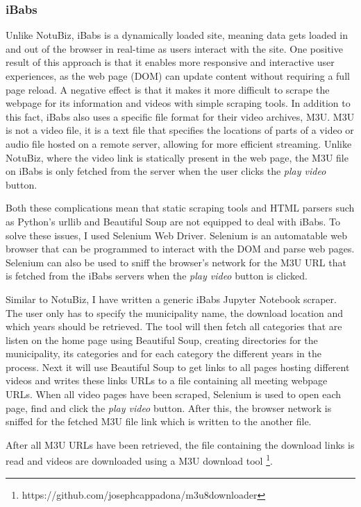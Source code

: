 \documentclass[twoside]{uva-inf-bachelor-thesis}
\begin{document}
\subsubsection{iBabs}
Unlike NotuBiz, iBabs is a dynamically loaded site, meaning data gets loaded in and out of the browser in real-time as users interact with the site. One positive result of this approach is that it enables more responsive and interactive user experiences, as the web page (DOM) can update content without requiring a full page reload. A negative effect is that it makes it more difficult to scrape the webpage for its information and videos with simple scraping tools.
In addition to this fact, iBabs also uses a specific file format for their video archives, M3U. M3U is not a video file, it is a text file that specifies the locations of parts of a video or audio file hosted on a remote server, allowing for more efficient streaming. 
Unlike NotuBiz, where the video link is statically present in the web page, the M3U file on iBabs is only fetched from the server when the user clicks the \textit{play video} button. 

Both these complications mean that static scraping tools and HTML parsers such as Python's urllib and Beautiful Soup are not equipped to deal with iBabs. To solve these issues, I used Selenium Web Driver. Selenium is an automatable web browser that can be programmed to interact with the DOM and parse web pages. Selenium can also be used to sniff the browser's network for the M3U URL that is fetched from the iBabs servers when the \textit{play video} button is clicked. 

Similar to NotuBiz, I have written a generic iBabs Jupyter Notebook scraper. The user only has to specify the municipality name, the download location and which years should be retrieved. 
The tool will then fetch all categories that are listen on the home page using Beautiful Soup, creating directories for the municipality, its categories and for each category the different years in the process.
Next it will use Beautiful Soup to get links to all pages hosting different videos and writes these links URLs to a file containing all meeting webpage URLs. 
When all video pages have been scraped, Selenium is used to open each page, find and click the \textit{play video} button. After this, the browser network is sniffed for the fetched M3U file link which is written to the another file.

After all M3U URLs have been retrieved, the file containing the download links is read and videos are downloaded using a M3U download tool \footnote{https://github.com/josephcappadona/m3u8downloader}.
\end{document}
